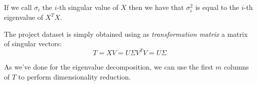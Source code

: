 If we call $\sigma_i$ the $i$-th singular value of $X$ then we have that $\sigma_i^2$ is equal to the $i$-th eigenvalue of $X^T X$.

The project dataset is simply obtained using as \textit{transformation matrix} a matrix of singular vectors:
\[
    T = X V = U \Sigma V^T V = U \Sigma
\]

As we've done for the eigenvalue decomposition, we can use the first $m$ columns of $T$ to perform dimensionality reduction.
